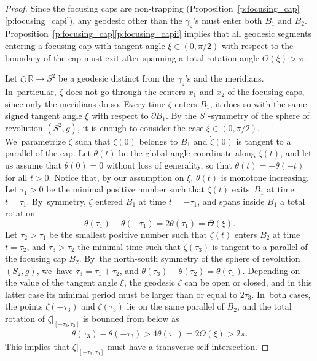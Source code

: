 \documentclass[JEP,XML,SOM,Unicode,NoFloatCountersInSection,published]{cedram}
\newcommand{\R}{\mathbb{R}}
\theoremstyle{plain}
\theoremstyle{definition}
\begin{document}
\begin{proof}
Since the focusing caps are non-trapping (Proposition~\ref{p:focusing_cap}\eqref{p:focusing_capi}), any geodesic other than the $\gamma_z$'s must enter both $B_1$ and $B_2$. Proposition~\ref{p:focusing_cap}\eqref{p:focusing_capii} implies that all geodesic segments entering a focusing cap with tangent angle $\xi\in(0,\pi/2)$ with respect to the boundary of the cap must exit after spanning a total rotation angle $\Theta(\xi)>\pi$.

Let $\zeta:\R\to S^2$ be a geodesic distinct from the $\gamma_z$'s and the meridians. In~particular, $\zeta$ does not go through the centers $x_1$ and $x_2$ of the focusing caps, since only the meridians do so. Every time $\zeta$ enters $B_1$, it does so with the same signed tangent angle $\xi$ with respect to $\partial B_1$.
By the $S^1$-symmetry of the sphere of revolution $(S^2,g)$, it is enough to consider the case $\xi\in(0,\pi/2)$. We~parametrize $\zeta$ such that $\zeta(0)$ belongs to $B_1$ and $\dot\zeta(0)$ is tangent to a parallel of the cap. Let $\theta(t)$ be the global angle coordinate along $\zeta(t)$, and let us assume that $\theta(0)=0$ without loss of generality, so that $\theta(t)=-\theta(-t)$ for all $t>0$. Notice that, by our assumption on $\xi$, $\theta(t)$ is monotone increasing. Let $\tau_1>0$ be the minimal positive number such that $\zeta(t)$ exits~$B_1$ at time $t=\tau_1$. By~symmetry, $\zeta$ entered $B_1$ at time $t=-\tau_1$, and spans inside $B_1$ a total rotation
\[
\theta(\tau_1)-\theta(-\tau_1)=2\theta(\tau_1)=\Theta(\xi).
\]
Let $\tau_2>\tau_1$ be the smallest positive number such that $\zeta(t)$ enters $B_2$ at time $t=\tau_2$, and $\tau_3>\tau_2$ the minimal time such that $\dot\zeta(\tau_3)$ is tangent to a parallel of the focusing cap $B_2$. By~the north-south symmetry of the sphere of revolution $(S_2,g)$, we~have $\tau_3=\tau_1+\tau_2$, and $\theta(\tau_3)-\theta(\tau_2)=\theta(\tau_1)$. Depending on the value of the tangent angle $\xi$, the geodesic $\zeta$ can be open or closed, and in this latter case its minimal period must be larger than or equal to $2\tau_3$. In~both cases, the points $\zeta(-\tau_3)$ and $\zeta(\tau_3)$ lie on the same parallel of $B_2$, and the total rotation of $\zeta|_{[-\tau_3,\tau_3]}$ is bounded from below as
\begin{align*}
\theta(\tau_3)-\theta(-\tau_3)
>
4\theta(\tau_1)
=
2\Theta(\xi)
>2\pi.
\end{align*}
This implies that $\zeta|_{[-\tau_3,\tau_3]}$ must have a transverse self-intersection.
\end{proof}
\end{document}
